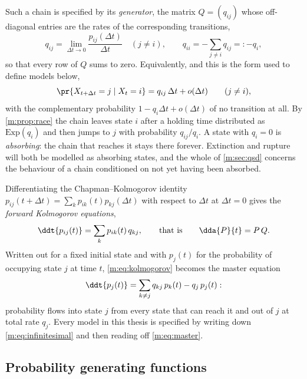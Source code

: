 Such a chain is specified by its \emph{generator}, the matrix $Q = (q_{ij})$ whose
off-diagonal entries are the rates of the corresponding transitions,
\begin{equation}
\label{m:eq:generator}
q_{ij} = \lim_{\Delta t\to0}\frac{p_{ij}(\Delta t)}{\Delta t}\quad(j\neq i),
\qquad
q_{ii} = -\sum_{j\neq i}q_{ij} =: -q_i ,
\end{equation}
so that every row of $Q$ sums to zero. Equivalently, and this is the form used to
define models below,
\begin{equation}
\label{m:eq:infinitesimal}
\pr{X_{t+\Delta t} = j \mid X_t = i} = q_{ij}\,\Delta t + o(\Delta t)
\qquad (j \neq i),
\end{equation}
with the complementary probability $1-q_i\Delta t + o(\Delta t)$ of no transition
at all. By \cref{m:prop:race} the chain leaves state $i$ after a holding time
distributed as $\mathrm{Exp}(q_i)$ and then jumps to $j$ with probability
$q_{ij}/q_i$. A state with $q_i=0$ is \emph{absorbing}: the chain that reaches it
stays there forever. Extinction and rupture will both be modelled as absorbing
states, and the whole of \cref{m:sec:qsd} concerns the behaviour of a chain
conditioned on not yet having been absorbed.

Differentiating the Chapman--Kolmogorov identity
$p_{ij}(t+\Delta t) = \sum_k p_{ik}(t)p_{kj}(\Delta t)$ with respect to $\Delta t$
at $\Delta t=0$ gives the \emph{forward Kolmogorov equations},
\begin{equation}
\label{m:eq:kolmogorov}
\ddt{p_{ij}(t)} = \sum_{k} p_{ik}(t)\,q_{kj},
\qquad\text{that is}\qquad
\dda{P}{t} = P\,Q .
\end{equation}
Written out for a fixed initial state and with $p_j(t)$ for the probability of
occupying state $j$ at time $t$, \cref{m:eq:kolmogorov} becomes the master equation
\begin{equation}
\label{m:eq:master}
\ddt{p_j(t)} = \sum_{k\neq j}q_{kj}\,p_k(t) - q_j\,p_j(t):
\end{equation}
probability flows into state $j$ from every state that can reach it and out of $j$
at total rate $q_j$. Every model in this thesis is specified by writing down
\cref{m:eq:infinitesimal} and then reading off \cref{m:eq:master}.

\subsection{Probability generating functions}
\label{m:sec:pgf}

